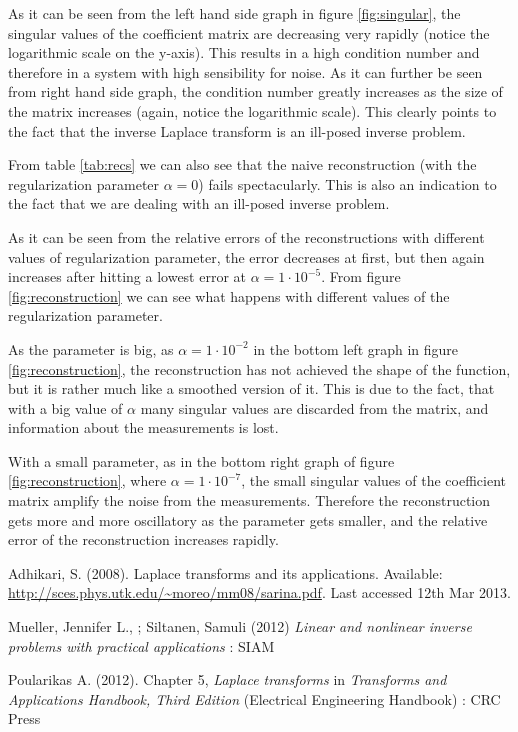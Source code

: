 \documentclass[12pt,a4]{article}
\begin{document}
As it can be seen from the left hand side graph in figure \ref{fig:singular}, the singular values of the coefficient matrix are decreasing very rapidly (notice the logarithmic scale on the y-axis). This results in a high condition number and therefore in a system with high sensibility for noise. As it can further be seen from right hand side graph, the condition number greatly increases as the size of the matrix increases (again, notice the logarithmic scale). This clearly points to the fact that the inverse Laplace transform is an ill-posed inverse problem.

From table \ref{tab:recs} we can also see that the naive reconstruction (with the regularization parameter $\alpha = 0$) fails spectacularly. This is also an indication to the fact that we are dealing with an ill-posed inverse problem.

As it can be seen from the relative errors of the reconstructions with different values of regularization parameter, the error decreases at first, but then again increases after hitting a lowest error at $\alpha = 1 \cdot 10^{-5}$. From figure \ref{fig:reconstruction} we can see what happens with different values of the regularization parameter.

As the parameter is big, as $\alpha = 1 \cdot 10^{-2}$ in the bottom left graph in figure \ref{fig:reconstruction}, the reconstruction has not achieved the shape of the function, but it is rather much like a smoothed version of it. This is due to the fact, that with a big value of $\alpha$ many singular values are discarded from the matrix, and information about the measurements is lost.

With a small parameter, as in the bottom right graph of figure \ref{fig:reconstruction}, where $\alpha = 1 \cdot 10^{-7}$, the small singular values of the coefficient matrix amplify the noise from the measurements. Therefore the reconstruction gets more and more oscillatory as the parameter gets smaller, and the relative error of the reconstruction increases rapidly.



\newpage
\begin{thebibliography}{9}

Adhikari, S. (2008). Laplace transforms and its applications. Available: \url{http://sces.phys.utk.edu/~moreo/mm08/sarina.pdf}. Last accessed 12th Mar 2013.

Mueller, Jennifer L., ; Siltanen, Samuli (2012)
\emph{Linear and nonlinear inverse problems with practical applications} : SIAM

Poularikas A. (2012). Chapter 5, \emph{Laplace transforms} in \emph{Transforms and Applications Handbook, Third Edition} (Electrical Engineering Handbook) : CRC Press


\end{thebibliography}
\end{document}
